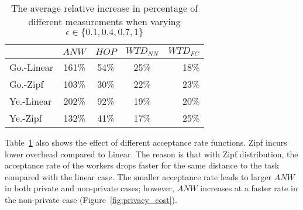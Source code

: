 \documentclass{USC-Thesis}
\newcommand{\tn}{\tabularnewline}
\numberwithin{equation}{chapter}
\begin{document}
\begin{table}
\begin{center}
\footnotesize
\begin{tabular}{ l | c | c | c | r}
\hline
\textbf{} & \textbf{$\mathit{ANW}$} & \textbf{$\mathit{HOP}$} & \textbf{$\mathit{WTD_{NN}}$} & \textbf{$\mathit{WTD_{FC}}$} \tn
\hline
Go.-Linear & 161\% & 54\% & 25\% & 18\% \tn
\hline
Go.-Zipf & 103\% & 30\% & 22\% & 23\% \tn
\hline
Ye.-Linear & 202\% & 92\% & 19\%& 20\% \tn
\hline
Ye.-Zipf & 132\% & 41\% & 17\%& 25\% \tn
\hline
\end{tabular}
\caption{The average relative increase in percentage of different measurements when varying $\epsilon \in \{0.1, 0.4,0.7,1\}$}
\label{tab:privacy_cost}
\end{center}
\end{table}

Table~\ref{tab:privacy_cost} also shows the effect of different acceptance rate functions. Zipf incurs lower overhead compared to Linear. The reason is that with Zipf distribution, the acceptance rate of the workers drops faster for the same distance to the task compared with the linear case. The smaller acceptance rate leads to larger $\mathit{ANW}$ in both private and non-private cases; however, $\mathit{ANW}$ increases at a faster rate in the non-private case (Figure~\ref{fig:privacy_cost}).
\end{document}
